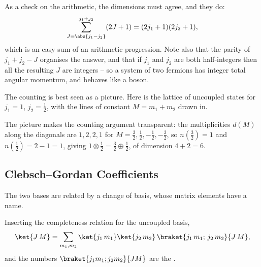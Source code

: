 As a check on the arithmetic, the dimensions must agree, and they do:
$$
\sum_{J = \abs{j_1-j_2}}^{j_1+j_2}(2J+1) = (2j_1+1)(2j_2+1),
$$
which is an easy sum of an arithmetic progression. Note also that the parity of $j_1 + j_2 - J$ organises the answer, and that if $j_1$ and $j_2$ are both half-integers then all the resulting $J$ are integers -- so a system of two fermions has integer total angular momentum, and behaves like a boson.

The counting is best seen as a picture. Here is the lattice of uncoupled states for $j_1 = 1$, $j_2 = \frac12$, with the lines of constant $M = m_1+m_2$ drawn in.

\begin{center}
\end{center}

The picture makes the counting argument transparent: the multiplicities $d(M)$ along the diagonals are $1,2,2,1$ for $M = \frac32,\frac12,-\frac12,-\frac32$, so $n(\frac32) = 1$ and $n(\frac12) = 2-1 = 1$, giving $1 \otimes \frac12 = \frac32 \oplus \frac12$, of dimension $4+2 = 6$.

\subsection{Clebsch--Gordan Coefficients}

The two bases are related by a change of basis, whose matrix elements have a name.

\begin{definition}
    Inserting the completeness relation for the uncoupled basis,
    $$
    \ket{J\,M} = \sum_{m_1,m_2}\ket{j_1\,m_1}\ket{j_2\,m_2}\,\braket{j_1\,m_1;\,j_2\,m_2}{J\,M},
    $$
    and the numbers $\braket{j_1 m_1; j_2m_2}{JM}$ are the .
\end{definition}

